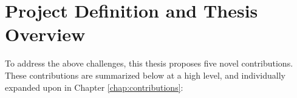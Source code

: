 

\section{Project Definition and Thesis Overview}
\label{sec:definition}

To address the above challenges, this thesis proposes five novel contributions. These contributions are summarized below at a high level, and individually expanded upon in Chapter \ref{chap:contributions}:

